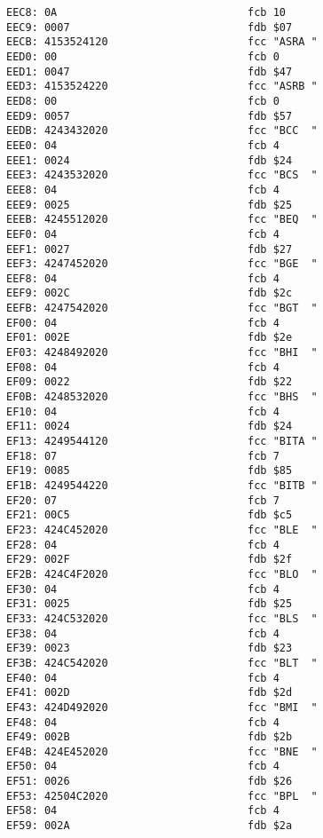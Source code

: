 {\begin{verbatim}
EEC8: 0A                              fcb 10
EEC9: 0007                            fdb $07
EECB: 4153524120                      fcc "ASRA "
EED0: 00                              fcb 0
EED1: 0047                            fdb $47
EED3: 4153524220                      fcc "ASRB "
EED8: 00                              fcb 0
EED9: 0057                            fdb $57
EEDB: 4243432020                      fcc "BCC  "
EEE0: 04                              fcb 4
EEE1: 0024                            fdb $24
EEE3: 4243532020                      fcc "BCS  "
EEE8: 04                              fcb 4 
EEE9: 0025                            fdb $25
EEEB: 4245512020                      fcc "BEQ  "
EEF0: 04                              fcb 4
EEF1: 0027                            fdb $27
EEF3: 4247452020                      fcc "BGE  "
EEF8: 04                              fcb 4
EEF9: 002C                            fdb $2c
EEFB: 4247542020                      fcc "BGT  "
EF00: 04                              fcb 4
EF01: 002E                            fdb $2e
EF03: 4248492020                      fcc "BHI  "
EF08: 04                              fcb 4
EF09: 0022                            fdb $22
EF0B: 4248532020                      fcc "BHS  "
EF10: 04                              fcb 4
EF11: 0024                            fdb $24
EF13: 4249544120                      fcc "BITA "
EF18: 07                              fcb 7
EF19: 0085                            fdb $85
EF1B: 4249544220                      fcc "BITB "
EF20: 07                              fcb 7
EF21: 00C5                            fdb $c5
EF23: 424C452020                      fcc "BLE  "
EF28: 04                              fcb 4
EF29: 002F                            fdb $2f
EF2B: 424C4F2020                      fcc "BLO  "
EF30: 04                              fcb 4
EF31: 0025                            fdb $25
EF33: 424C532020                      fcc "BLS  "
EF38: 04                              fcb 4
EF39: 0023                            fdb $23
EF3B: 424C542020                      fcc "BLT  "
EF40: 04                              fcb 4
EF41: 002D                            fdb $2d
EF43: 424D492020                      fcc "BMI  "
EF48: 04                              fcb 4
EF49: 002B                            fdb $2b
EF4B: 424E452020                      fcc "BNE  "
EF50: 04                              fcb 4
EF51: 0026                            fdb $26
EF53: 42504C2020                      fcc "BPL  "
EF58: 04                              fcb 4
EF59: 002A                            fdb $2a

\end{verbatim}}
